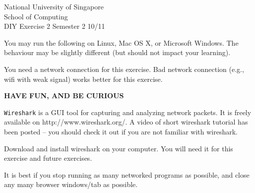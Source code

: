 \documentclass[a4paper,11pt]{exam}
\begin{document}
\extraheadheight{.5in}
%
{\large\sf National University of Singapore\\ School of Computing \\
\LARGE\sf DIY Exercise 2}%
{\large\sf Semester 2 10/11}
\firstpageheadrule
\pagestyle{headandfoot}

You may run the following on Linux, Mac OS X, or Microsoft Windows.  The behaviour may be slightly different (but should not impact your learning).

You need a network connection for this exercise.  Bad network connection (e.g., wifi with weak signal) works better for this exercise.

\begin{center}
	\textbf\textsf{HAVE FUN, AND BE CURIOUS}
\end{center}


\texttt{Wireshark} is a GUI tool for capturing and analyzing network packets.  It is freely available on http://www.wireshark.org/.  A video of short wireshark tutorial has been posted -- you should check it out if you are not familiar with wireshark.

Download and install wireshark on your computer.  You will need it for this exercise and future exercises.

It is best if you stop running as many networked programs as possible, and close any many browser windows/tab as possible.
\end{document}

